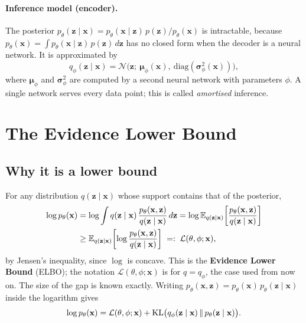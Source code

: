 \paragraph{Inference model (encoder).}
The posterior
$p_\theta(\mathbf{z} \mid \mathbf{x}) =
p_\theta(\mathbf{x} \mid \mathbf{z})\,p(\mathbf{z})/p_\theta(\mathbf{x})$
is intractable, because
$p_\theta(\mathbf{x}) = \int p_\theta(\mathbf{x} \mid \mathbf{z})\,
p(\mathbf{z})\,d\mathbf{z}$ has no closed form when the decoder is a
neural network. It is approximated by
\begin{equation*}
    q_{\phi}(\mathbf{z} \mid \mathbf{x}) =
    \mathcal{N}\big(\mathbf{z};\ \boldsymbol{\mu}_{\phi}(\mathbf{x}),\
    \mathrm{diag}(\boldsymbol{\sigma}^2_{\phi}(\mathbf{x}))\big),
\end{equation*}
where $\boldsymbol{\mu}_{\phi}$ and $\boldsymbol{\sigma}^2_{\phi}$ are
computed by a second neural network with parameters $\phi$. A single
network serves every data point; this is called \emph{amortised}
inference.

\section{The Evidence Lower Bound}

\subsection{Why it is a lower bound}

For any distribution $q(\mathbf{z} \mid \mathbf{x})$ whose support
contains that of the posterior,
\begin{align*}
    \log p_\theta(\mathbf{x})
    &= \log \int q(\mathbf{z} \mid \mathbf{x})\,
       \frac{p_\theta(\mathbf{x}, \mathbf{z})}{q(\mathbf{z} \mid
       \mathbf{x})}\,d\mathbf{z}
     = \log \mathbb{E}_{q(\mathbf{z} \mid \mathbf{x})}\!\left[
       \frac{p_\theta(\mathbf{x}, \mathbf{z})}{q(\mathbf{z} \mid
       \mathbf{x})}\right] \\
    &\geq \mathbb{E}_{q(\mathbf{z} \mid \mathbf{x})}\!\left[\log
       \frac{p_\theta(\mathbf{x}, \mathbf{z})}{q(\mathbf{z} \mid
       \mathbf{x})}\right] \;=:\; \mathcal{L}(\theta, \phi; \mathbf{x}),
\end{align*}
by Jensen's inequality, since $\log$ is concave. This is the
\textbf{Evidence Lower Bound} (ELBO); the notation
$\mathcal{L}(\theta, \phi; \mathbf{x})$ is for $q = q_\phi$, the case
used from now on. The size of the gap is known exactly. Writing
$p_\theta(\mathbf{x}, \mathbf{z}) = p_\theta(\mathbf{x})\,
p_\theta(\mathbf{z} \mid \mathbf{x})$ inside the logarithm gives
\begin{equation}
    \log p_\theta(\mathbf{x}) = \mathcal{L}(\theta, \phi; \mathbf{x}) +
    \mathrm{KL}\big(q_\phi(\mathbf{z} \mid \mathbf{x}) \,\|\,
    p_\theta(\mathbf{z} \mid \mathbf{x})\big).
    \label{eq:elbo_gap}
\end{equation}


